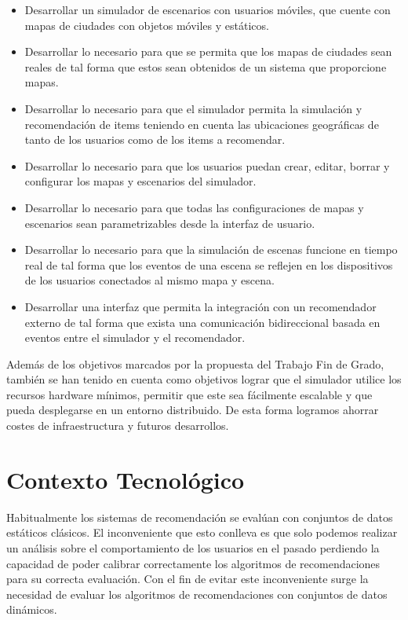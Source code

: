 \begin{itemize}
       \item Desarrollar un simulador de escenarios con usuarios móviles, que cuente con mapas de ciudades con objetos móviles y estáticos.
       \item Desarrollar lo necesario para que se permita que los mapas de ciudades sean reales de tal forma que estos sean obtenidos de un sistema que proporcione mapas.
       \item Desarrollar lo necesario para que el simulador permita la simulación y recomendación de items teniendo en cuenta las ubicaciones geográficas de tanto de los usuarios como de los items a recomendar.
       \item Desarrollar lo necesario para que los usuarios puedan crear, editar, borrar y configurar los mapas y escenarios del simulador.
       \item Desarrollar lo necesario para que todas las configuraciones de mapas y escenarios sean parametrizables desde la interfaz de usuario.
       \item Desarrollar lo necesario para que la simulación de escenas funcione en tiempo real de tal forma que los eventos de una escena se reflejen en los dispositivos de los usuarios conectados al mismo mapa y escena.
       \item Desarrollar una interfaz que permita la integración con un recomendador externo de tal forma que exista una comunicación bidireccional basada en eventos entre el simulador y el recomendador.
\end{itemize}

Además de los objetivos marcados por la propuesta del Trabajo Fin de Grado, también se han tenido en cuenta como objetivos lograr que el simulador utilice los recursos hardware mínimos, permitir que este sea fácilmente escalable y que pueda desplegarse en un entorno distribuido. De esta forma logramos ahorrar costes de infraestructura y futuros desarrollos.

\section{Contexto Tecnológico}

Habitualmente los sistemas de recomendación se evalúan con conjuntos de datos estáticos clásicos. El inconveniente que esto conlleva es que solo podemos realizar un análisis sobre el comportamiento de los usuarios en el pasado perdiendo la capacidad de poder calibrar correctamente los algoritmos de recomendaciones para su correcta evaluación. Con el fin de evitar este inconveniente surge la necesidad de evaluar los algoritmos de recomendaciones con conjuntos de datos dinámicos.

